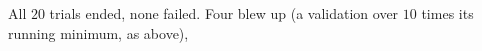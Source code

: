 \documentclass[11pt]{article}
\begin{document}
\begin{itemize}
    All $20$ trials ended, none failed. Four blew up (a validation over $10$ times its running minimum, as above),

\end{itemize}
\end{document}
